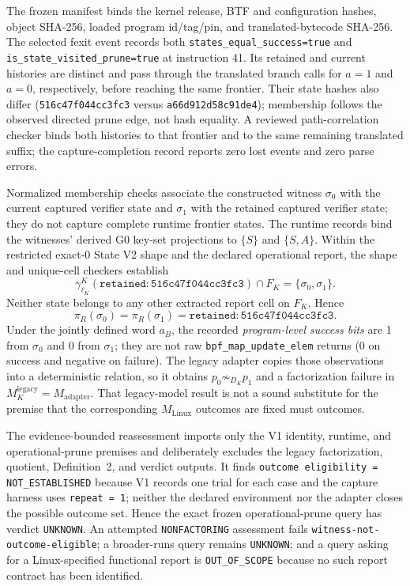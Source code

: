 \documentclass[conference]{IEEEtran}
\begin{document}
The frozen manifest binds the kernel release, BTF and configuration hashes, object SHA-256, loaded program id/tag/pin, and translated-bytecode SHA-256. The selected fexit event records both \texttt{states\_equal\_success=true} and \texttt{is\_state\_visited\_prune=true} at instruction 41. Its retained and current histories are distinct and pass through the translated branch calls for $a=1$ and $a=0$, respectively, before reaching the same frontier. Their state hashes also differ (\texttt{516c47f044cc3fc3} versus \texttt{a66d912d58c91de4}); membership follows the observed directed prune edge, not hash equality. A reviewed path-correlation checker binds both histories to that frontier and to the same remaining translated suffix; the capture-completion record reports zero lost events and zero parse errors.

Normalized membership checks associate the constructed witness $\sigma_0$ with the current captured verifier state and $\sigma_1$ with the retained captured verifier state; they do not capture complete runtime frontier states. The runtime records bind the witnesses' derived G0 key-set projections to $\{S\}$ and $\{S,A\}$. Within the restricted exact-0 State V2 shape and the declared operational report, the shape and unique-cell checkers establish
\begin{equation}
\gamma^K_{\ell_K}(\mathtt{retained{:}516c47f044cc3fc3})\cap F_K
=\{\sigma_0,\sigma_1\}.
\end{equation}
Neither state belongs to any other extracted report cell on $F_K$. Hence
\begin{equation}
\pi_R(\sigma_0)=\pi_R(\sigma_1)
=\mathtt{retained{:}516c47f044cc3fc3}.
\end{equation}
Under the jointly defined word $a_B$, the recorded \emph{program-level success bits} are 1 from $\sigma_0$ and 0 from $\sigma_1$; they are not raw \texttt{bpf\_map\_update\_elem} returns (0 on success and negative on failure). The legacy adapter copies those observations into a deterministic relation, so it obtains $p_0\not\sim_{D_K}p_1$ and a factorization failure in $M_K^{\mathrm{legacy}}=M_{\mathrm{adapter}}$. That legacy-model result is not a sound substitute for the premise that the corresponding $M_{\mathrm{Linux}}$ outcomes are fixed must outcomes.

The evidence-bounded reassessment imports only the V1 identity, runtime, and operational-prune premises and deliberately excludes the legacy factorization, quotient, Definition~2, and verdict outputs. It finds \texttt{outcome eligibility = NOT\_ESTABLISHED} because V1 records one trial for each case and the capture harness uses \texttt{repeat = 1}; neither the declared environment nor the adapter closes the possible outcome set. Hence the exact frozen operational-prune query has verdict \texttt{UNKNOWN}. An attempted \texttt{NONFACTORING} assessment fails \texttt{witness-not-outcome-eligible}; a broader-runs query remains \texttt{UNKNOWN}; and a query asking for a Linux-specified functional report is \texttt{OUT\_OF\_SCOPE} because no such report contract has been identified.
\end{document}
